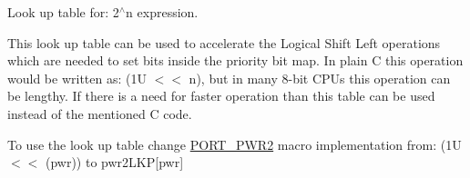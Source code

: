 Look up table for\-: 2$^\wedge$n expression. 

This look up table can be used to accelerate the Logical Shift Left operations which are needed to set bits inside the priority bit map. In plain C this operation would be written as\-: {\ttfamily (1\-U $<$$<$ n)}, but in many 8-\/bit C\-P\-Us this operation can be lengthy. If there is a need for faster operation than this table can be used instead of the mentioned C code.

To use the look up table change \hyperlink{group__template__cpu__intf_ga4b938b55e8398b93969cfb7bc64177cd}{P\-O\-R\-T\-\_\-\-P\-W\-R2} macro implementation from\-: {\ttfamily (1\-U $<$$<$ (pwr))} to {\ttfamily pwr2\-L\-K\-P\mbox{[}pwr\mbox{]}} 